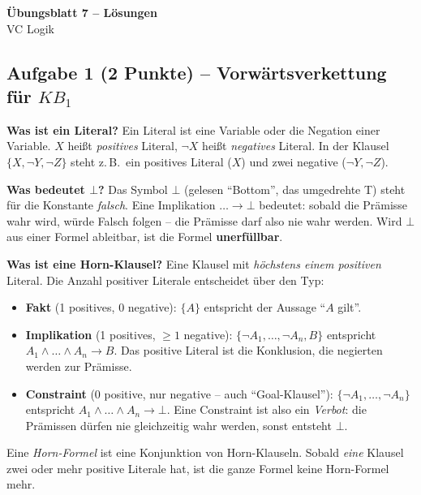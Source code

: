 \documentclass[a4paper,12pt]{article}
\begin{document}
\begin{center}
{\LARGE\bfseries \"Ubungsblatt 7 -- L\"osungen}\\[0.5em]
{\large VC Logik}
\end{center}

\bigskip

\subsection*{Aufgabe 1 \textnormal{(2 Punkte)} -- Vorw\"artsverkettung f\"ur $KB_1$}

\textbf{Was ist ein Literal?}
Ein Literal ist eine Variable oder die Negation einer Variable. $X$
hei\ss t \emph{positives} Literal, $\neg X$ hei\ss t \emph{negatives}
Literal. In der Klausel $\{X, \neg Y, \neg Z\}$ steht z.\,B.\ ein
positives Literal ($X$) und zwei negative ($\neg Y, \neg Z$).

\medskip
\textbf{Was bedeutet $\bot$?}
Das Symbol $\bot$ (gelesen ``Bottom'', das umgedrehte T) steht f\"ur die
Konstante \emph{falsch}. Eine Implikation $\dots \to \bot$ bedeutet:
sobald die Pr\"amisse wahr wird, w\"urde Falsch folgen -- die Pr\"amisse
darf also nie wahr werden. Wird $\bot$ aus einer Formel ableitbar, ist
die Formel \textbf{unerf\"ullbar}.

\medskip
\textbf{Was ist eine Horn-Klausel?}
Eine Klausel mit \emph{h\"ochstens einem positiven} Literal. Die Anzahl
positiver Literale entscheidet \"uber den Typ:
\begin{itemize}[nosep,leftmargin=2em]
\item \textbf{Fakt} (1 positives, 0 negative): $\{A\}$ entspricht der
      Aussage ``$A$ gilt''.
\item \textbf{Implikation} (1 positives, $\geq 1$ negative):
      $\{\neg A_1, \dots, \neg A_n, B\}$ entspricht
      $A_1 \wedge \dots \wedge A_n \to B$. Das positive Literal ist die
      Konklusion, die negierten werden zur Pr\"amisse.
\item \textbf{Constraint} (0 positive, nur negative -- auch
      ``Goal-Klausel''): $\{\neg A_1, \dots, \neg A_n\}$ entspricht
      $A_1 \wedge \dots \wedge A_n \to \bot$. Eine Constraint ist also
      ein \emph{Verbot}: die Pr\"amissen d\"urfen nie gleichzeitig wahr
      werden, sonst entsteht $\bot$.
\end{itemize}
Eine \emph{Horn-Formel} ist eine Konjunktion von Horn-Klauseln. Sobald
\emph{eine} Klausel zwei oder mehr positive Literale hat, ist die ganze
Formel keine Horn-Formel mehr.
\end{document}
